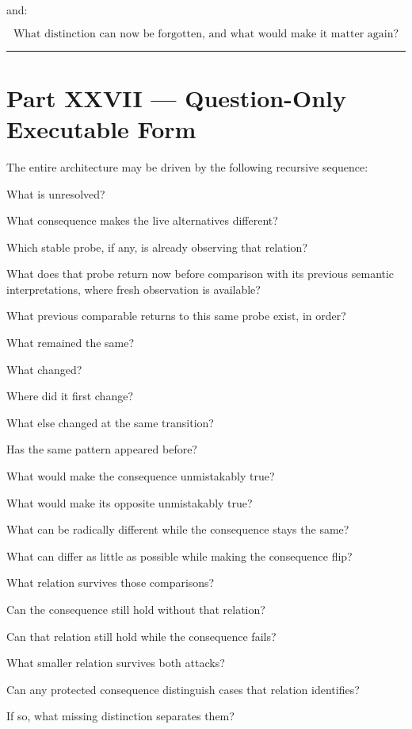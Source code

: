 \documentclass[
]{article}
\begin{document}
and:

\[
\boxed{
\text{What distinction can now be forgotten, and what would make it matter again?}
}
\]

\begin{center}\rule{0.5\linewidth}{0.5pt}\end{center}

\section{Part XXVII --- Question-Only Executable
Form}\label{part-xxvii-question-only-executable-form}

The entire architecture may be driven by the following recursive
sequence:


What is unresolved?

What consequence makes the live alternatives different?

Which stable probe, if any, is already observing that relation?

What does that probe return now before comparison with its previous semantic
interpretations, where fresh observation is available?

What previous comparable returns to this same probe exist, in order?

What remained the same?

What changed?

Where did it first change?

What else changed at the same transition?

Has the same pattern appeared before?

What would make the consequence unmistakably true?

What would make its opposite unmistakably true?

What can be radically different while the consequence stays the same?

What can differ as little as possible while making the consequence flip?

What relation survives those comparisons?

Can the consequence still hold without that relation?

Can that relation still hold while the consequence fails?

What smaller relation survives both attacks?

Can any protected consequence distinguish cases that relation identifies?

If so, what missing distinction separates them?
\end{document}
